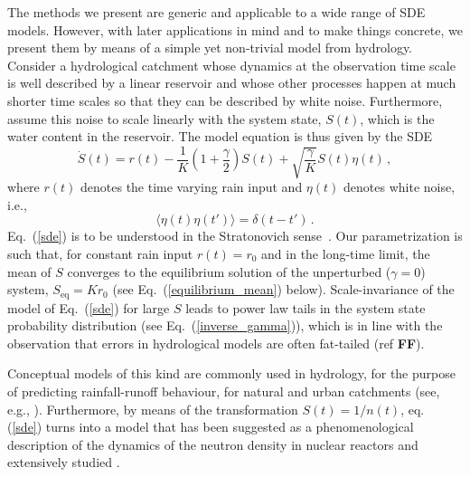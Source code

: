 \documentclass[12pt,a4paper,final]{iopart}
\newcommand{\eq}{\mbox{eq}}
\begin{document}
The methods we present are generic and applicable to a wide range of SDE models.
However, with later applications in mind and to make things concrete, we present them by means of a simple yet non-trivial model from hydrology.
Consider a hydrological catchment whose dynamics at the observation time scale is well described by a linear reservoir and whose other processes happen at much shorter time scales so that they can be described by white noise.
Furthermore, assume this noise to scale linearly with the system state, $S(t)$, which is the water content in the reservoir.
The model equation is thus given by the SDE
\begin{equation}\label{sde}
\dot{S}(t) = r(t) - \frac{1}{K}\left(1+\frac{\gamma}{2}\right) S(t)
+
\sqrt{\frac{\gamma}{K}} S(t){\eta}(t)\,,
\end{equation}
where $r(t)$ denotes the time varying rain input and $\eta(t)$ denotes white noise, i.e.,
\begin{equation}\label{whitenoise}
\langle\eta(t)\eta(t')\rangle = \delta(t-t')\,.
\end{equation}
Eq.~(\ref{sde}) is to be understood in the Stratonovich sense~\cite{stratonovich_1968}.
Our parametrization is such that, for constant rain input $r(t)=r_0$ and in the long-time limit, the mean of $S$ converges to the equilibrium solution of the unperturbed ($\gamma=0$) system, $S_{\eq}=Kr_0$ (see Eq.~(\ref{equilibrium_mean}) below).
Scale-invariance of the model of Eq.~(\ref{sde}) for large $S$ leads to power law tails in the system state probability distribution (see Eq.~(\ref{inverse_gamma})), which is in line with the observation that errors in hydrological models are often fat-tailed (ref \textbf{FF}).

Conceptual models of this kind are commonly used in hydrology, for the purpose of predicting rainfall-runoff behaviour, for natural and urban catchments (see, e.g., \cite{breinholt_2011_SDE}).
Furthermore, by means of the transformation $S(t)=1/n(t)$, eq. (\ref{sde}) turns into a model that has been suggested as a phenomenological description of the dynamics of the neutron density in nuclear reactors and extensively studied \cite{dutre_1977_SDE, fujisaka_1986_intermittency}.
\end{document}
